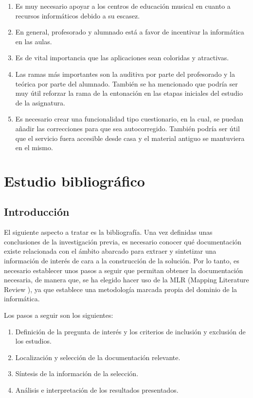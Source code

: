 \begin{enumerate}
\item Es muy necesario apoyar a los centros de educación musical en cuanto a recursos informáticos debido a su escasez.

\item En general, profesorado y alumnado está a favor de incentivar la informática en las aulas.

\item Es de vital importancia que las aplicaciones sean coloridas y atractivas.

\item Las ramas más importantes son la auditiva por parte del profesorado y la teórica por parte del alumnado. También se ha mencionado que podría ser muy útil reforzar la rama de la entonación en las etapas iniciales del estudio de la asignatura.

\item Es necesario crear una funcionalidad tipo cuestionario, en la cual, se puedan añadir las correcciones para que sea autocorregido. También podría ser útil que el servicio fuera accesible desde casa y el material antiguo se mantuviera en el mismo.
\end{enumerate}
\section {Estudio bibliográfico}

\label{sec:estudio_biblio}

\subsection {Introducción}

El siguiente aspecto a tratar es la bibliografía. Una vez definidas unas conclusiones de la investigación previa, es necesario conocer qué documentación existe relacionada con el ámbito abarcado para extraer y sintetizar una información de interés de cara a la construcción de la solución. Por lo tanto, es necesario establecer unos pasos a seguir que permitan obtener la documentación necesaria, de manera que, se ha elegido hacer uso de la MLR (Mapping Literature Review \cite{PrincetonLitMapping}), ya que establece una metodología marcada propia del dominio de la informática.

Los pasos a seguir son los siguientes:

\begin{enumerate}
\item Definición de la pregunta de interés y los criterios de inclusión y exclusión de los estudios.
\item Localización y selección de la documentación relevante.
\item Síntesis de la información de la selección.
\item Análisis e interpretación de los resultados presentados.
\end{enumerate}
\newpage
